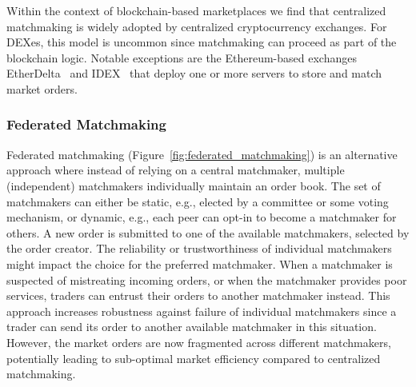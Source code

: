 Within the context of blockchain-based marketplaces we find that centralized matchmaking is widely adopted by centralized cryptocurrency exchanges.
For DEXes, this model is uncommon since matchmaking can proceed as part of the blockchain logic.
Notable exceptions are the Ethereum-based exchanges EtherDelta~\cite{etherdelta} and IDEX~\cite{idex} that deploy one or more servers to store and match market orders.


\subsubsection{Federated Matchmaking}

Federated matchmaking (Figure~\ref{fig:federated_matchmaking}) is an alternative approach where instead of relying on a central matchmaker, multiple (independent) matchmakers individually maintain an order book.
The set of matchmakers can either be static, e.g., elected by a committee or some voting mechanism, or dynamic, e.g., each peer can opt-in to become a matchmaker for others.
A new order is submitted to one of the available matchmakers, selected by the order creator.
The reliability or trustworthiness of individual matchmakers might impact the choice for the preferred matchmaker.
When a matchmaker is suspected of mistreating incoming orders, or when the matchmaker provides poor services, traders can entrust their orders to another matchmaker instead.
This approach increases robustness against failure of individual matchmakers since a trader can send its order to another available matchmaker in this situation.
However, the market orders are now fragmented across different matchmakers, potentially leading to sub-optimal market efficiency compared to centralized matchmaking.

